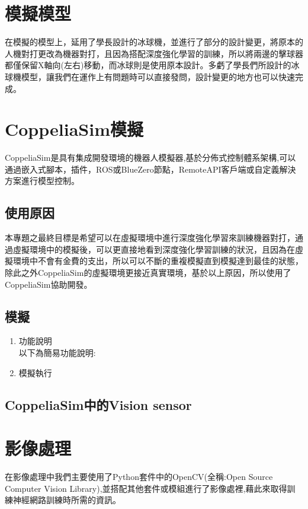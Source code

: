 \documentclass[14pt,a4paper]{report}  %
\begin{document}
\section{模擬模型}
 在模擬的模型上，延用了學長設計的冰球機，並進行了部分的設計變更，將原本的人機對打更改為機器對打，且因為搭配深度強化學習的訓練，所以將兩邊的擊球器都僅保留X軸向(左右)移動，而冰球則是使用原本設計。多虧了學長們所設計的冰球機模型，讓我們在運作上有問題時可以直接發問，設計變更的地方也可以快速完成。\\
\section{CoppeliaSim模擬}
 CoppeliaSim是具有集成開發環境的機器人模擬器,基於分佈式控制體系架構,可以通過嵌入式腳本，插件，ROS或BlueZero節點，RemoteAPI客戶端或自定義解決方案進行模型控制。\\
\subsection{使用原因}
 本專題之最終目標是希望可以在虛擬環境中進行深度強化學習來訓練機器對打，通過虛擬環境中的模擬後，可以更直接地看到深度強化學習訓練的狀況，且因為在虛擬環境中不會有金費的支出，所以可以不斷的重複模擬直到模擬達到最佳的狀態，除此之外CoppeliaSim的虛擬環境更接近真實環境，基於以上原因，所以使用了CoppeliaSim協助開發。\\
\subsection{模擬}
\begin{enumerate}

\item 功能說明\\
以下為簡易功能說明:
\item 模擬執行\\

\end{enumerate}
\subsection{CoppeliaSim中的Vision sensor}

\section{影像處理}
\qquad 在影像處理中我們主要使用了Python套件中的OpenCV(全稱:Open Source Computer Vision Library),並搭配其他套件或模組進行了影像處裡,藉此來取得訓練神經網路訓練時所需的資訊。\\
\end{document}

